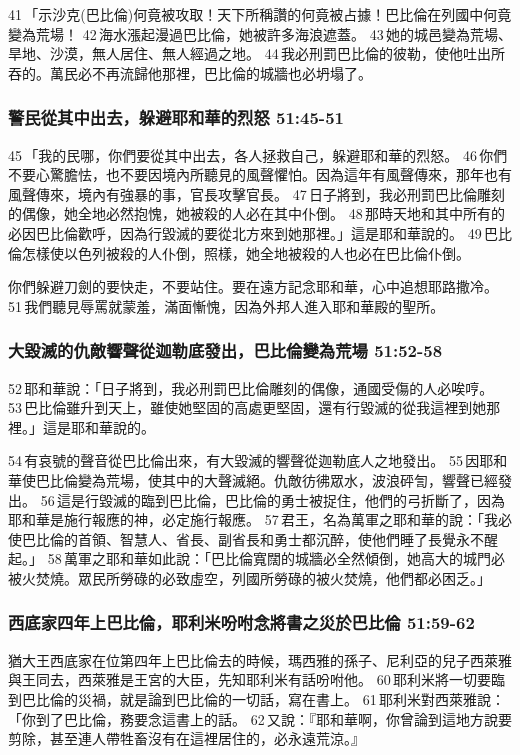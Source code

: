 41 「示沙克(巴比倫)何竟被攻取！天下所稱讚的何竟被占據！巴比倫在列國中何竟變為荒場！ 42 海水漲起漫過巴比倫，她被許多海浪遮蓋。 43 她的城邑變為荒場、旱地、沙漠，無人居住、無人經過之地。 44 我必刑罰巴比倫的彼勒，使他吐出所吞的。萬民必不再流歸他那裡，巴比倫的城牆也必坍塌了。


\subsubsection{警民從其中出去，躲避耶和華的烈怒 51:45-51}
45 「我的民哪，你們要從其中出去，各人拯救自己，躲避耶和華的烈怒。 46 你們不要心驚膽怯，也不要因境內所聽見的風聲懼怕。因為這年有風聲傳來，那年也有風聲傳來，境內有強暴的事，官長攻擊官長。 47 日子將到，我必刑罰巴比倫雕刻的偶像，她全地必然抱愧，她被殺的人必在其中仆倒。 48 那時天地和其中所有的必因巴比倫歡呼，因為行毀滅的要從北方來到她那裡。」這是耶和華說的。 49 巴比倫怎樣使以色列被殺的人仆倒，照樣，她全地被殺的人也必在巴比倫仆倒。

你們躲避刀劍的要快走，不要站住。要在遠方記念耶和華，心中追想耶路撒冷。 51 我們聽見辱罵就蒙羞，滿面慚愧，因為外邦人進入耶和華殿的聖所。 

\subsubsection{大毀滅的仇敵響聲從迦勒底發出，巴比倫變為荒場 51:52-58}
52 耶和華說：「日子將到，我必刑罰巴比倫雕刻的偶像，通國受傷的人必唉哼。 53 巴比倫雖升到天上，雖使她堅固的高處更堅固，還有行毀滅的從我這裡到她那裡。」這是耶和華說的。

54 有哀號的聲音從巴比倫出來，有大毀滅的響聲從迦勒底人之地發出。 55 因耶和華使巴比倫變為荒場，使其中的大聲滅絕。仇敵彷彿眾水，波浪砰訇，響聲已經發出。 56 這是行毀滅的臨到巴比倫，巴比倫的勇士被捉住，他們的弓折斷了，因為耶和華是施行報應的神，必定施行報應。 57 君王，名為萬軍之耶和華的說：「我必使巴比倫的首領、智慧人、省長、副省長和勇士都沉醉，使他們睡了長覺永不醒起。」 58 萬軍之耶和華如此說：「巴比倫寬闊的城牆必全然傾倒，她高大的城門必被火焚燒。眾民所勞碌的必致虛空，列國所勞碌的被火焚燒，他們都必困乏。」

\subsubsection{西底家四年上巴比倫，耶利米吩咐念將書之災於巴比倫 51:59-62}
猶大王西底家在位第四年上巴比倫去的時候，瑪西雅的孫子、尼利亞的兒子西萊雅與王同去，西萊雅是王宮的大臣，先知耶利米有話吩咐他。 60 耶利米將一切要臨到巴比倫的災禍，就是論到巴比倫的一切話，寫在書上。 61 耶利米對西萊雅說：「你到了巴比倫，務要念這書上的話。 62 又說：『耶和華啊，你曾論到這地方說要剪除，甚至連人帶牲畜沒有在這裡居住的，必永遠荒涼。』

